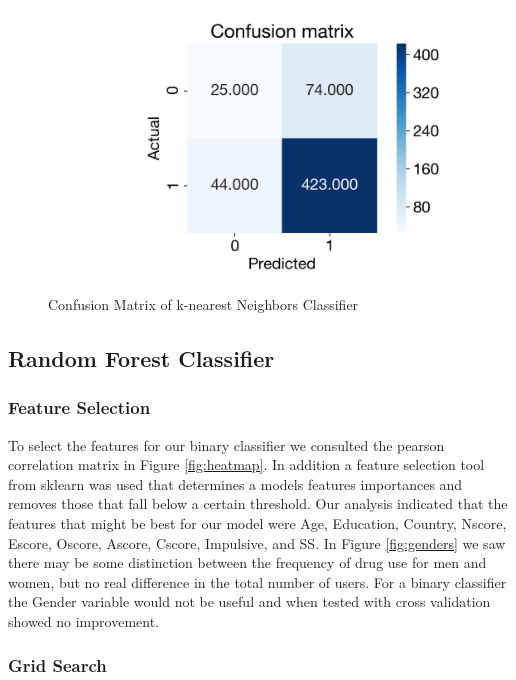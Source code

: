 \documentclass[10pt]{article}
\begin{document}
\begin{figure}[H]
\caption{Confusion Matrix of k-nearest Neighbors Classifier}
\label{fig:conf_matrix_knn}
\centering
\includegraphics[scale=0.4]{conf_matrix_knn.png}
\end{figure}

\subsection*{Random Forest Classifier}


\subsubsection*{Feature Selection}

To select the features for our binary classifier we consulted the pearson correlation matrix in Figure \ref{fig:heatmap}. In addition a feature selection tool from sklearn was used that determines a models features importances and removes those that fall below a certain threshold. Our analysis indicated that the features that might be best for our model were Age, Education, Country, Nscore, Escore, Oscore, Ascore, Cscore, Impulsive, and SS. In Figure \ref{fig:genders} we saw there may be some distinction between the frequency of drug use for men and women, but no real difference in the total number of users. For a binary classifier the Gender variable would not be useful and when tested with cross validation showed no improvement.

\subsubsection*{Grid Search}
\end{document}
